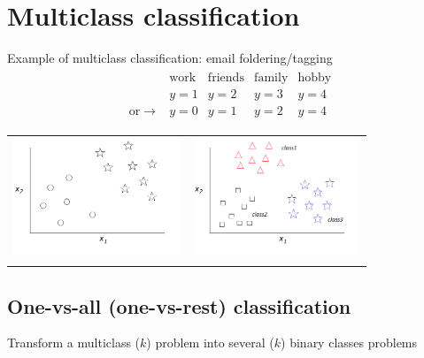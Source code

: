 \documentclass[a4paper,12pt]{report}
\begin{document}
\section{Multiclass classification}
Example of multiclass classification: email foldering/tagging \\
\begin{align*}
\begin{matrix} & \mathrm{work} & \mathrm{friends} & \mathrm{family} & \mathrm{hobby} \\
											& y=1 & y=2 & y=3 & y=4 \\
										\mathrm{or} \rightarrow & y=0 & y=1 & y=2 & y=4	
\end{matrix}
\end{align*}
\begin{table}[!htb]
\centering
\begin{tabular}{c|c}
\includegraphics[width=5cm]{class2.png} &
\includegraphics[width=5cm]{multiclass.png} \\
\textbf{\begin{footnotesize}Binary Classification\end{footnotesize}} & \textbf{\begin{footnotesize}Multiclass classification\end{footnotesize}}
\end{tabular}
\end{table}

\subsection{One-vs-all (one-vs-rest) classification}
Transform a multiclass ($k$) problem into several ($k$) binary classes problems
\end{document}
